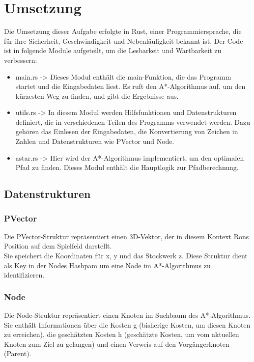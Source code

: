 \section{Umsetzung}
Die Umsetzung dieser Aufgabe erfolgte in Rust, einer Programmiersprache, die für ihre Sicherheit, Geschwindigkeit und Nebenläufigkeit bekannt ist.
Der Code ist in folgende Module aufgeteilt, um die Lesbarkeit und Wartbarkeit zu verbessern:
\begin{itemize}
    \item main.rs ->
          Dieses Modul enthält die main-Funktion, die das Programm startet und die Eingabedaten liest.
          Es ruft den A*-Algorithmus auf, um den kürzesten Weg zu finden, und gibt die Ergebnisse aus.

    \item utils.rs ->
          In diesem Modul werden Hilfsfunktionen und Datenstrukturen definiert, die in verschiedenen Teilen des Programms verwendet werden.
          Dazu gehören das Einlesen der Eingabedaten, die Konvertierung von Zeichen in Zahlen und Datenstrukturen wie PVector und Node.

    \item astar.rs ->
          Hier wird der A*-Algorithmus implementiert, um den optimalen Pfad zu finden.
          Dieses Modul enthält die Hauptlogik zur Pfadberechnung.
\end{itemize}

\subsection{Datenstrukturen}
\subsubsection*{PVector}
Die PVector-Struktur repräsentiert einen 3D-Vektor, der in diesem Kontext Rons Position auf dem Spielfeld darstellt.\\
Sie speichert die Koordinaten für x, y und das Stockwerk z.
Diese Struktur dient als Key in der Nodes Hashpam um eine Node im A*-Algorithmus zu identifizieren.
\subsubsection*{Node}
Die Node-Struktur repräsentiert einen Knoten im Suchbaum des A*-Algorithmus. \\
Sie enthält Informationen über die Kosten g (bisherige Kosten, um diesen Knoten zu erreichen),
die geschätzten Kosten h (geschätzte Kosten, um vom aktuellen Knoten zum Ziel zu gelangen)
und einen Verweis auf den Vorgängerknoten (Parent).

